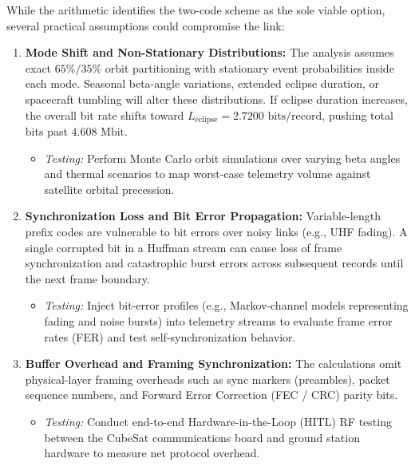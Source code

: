 \documentclass[11pt,a4paper]{article}
\begin{document}
While the arithmetic identifies the two-code scheme as the sole viable option, several practical assumptions could compromise the link:

\begin{enumerate}
    \item \textbf{Mode Shift and Non-Stationary Distributions:} The analysis assumes exact $65\% / 35\%$ orbit partitioning with stationary event probabilities inside each mode. Seasonal beta-angle variations, extended eclipse duration, or spacecraft tumbling will alter these distributions. If eclipse duration increases, the overall bit rate shifts toward $L_{\mathrm{eclipse}} = 2.7200\text{ bits/record}$, pushing total bits past $4.608\text{ Mbit}$.
    \begin{itemize}
        \item \textit{Testing:} Perform Monte Carlo orbit simulations over varying beta angles and thermal scenarios to map worst-case telemetry volume against satellite orbital precession.
    \end{itemize}

    \item \textbf{Synchronization Loss and Bit Error Propagation:} Variable-length prefix codes are vulnerable to bit errors over noisy links (e.g., UHF fading). A single corrupted bit in a Huffman stream can cause loss of frame synchronization and catastrophic burst errors across subsequent records until the next frame boundary.
    \begin{itemize}
        \item \textit{Testing:} Inject bit-error profiles (e.g., Markov-channel models representing fading and noise bursts) into telemetry streams to evaluate frame error rates (FER) and test self-synchronization behavior.
    \end{itemize}

    \item \textbf{Buffer Overhead and Framing Synchronization:} The calculations omit physical-layer framing overheads such as sync markers (preambles), packet sequence numbers, and Forward Error Correction (FEC / CRC) parity bits.
    \begin{itemize}
        \item \textit{Testing:} Conduct end-to-end Hardware-in-the-Loop (HITL) RF testing between the CubeSat communications board and ground station hardware to measure net protocol overhead.
    \end{itemize}
\end{enumerate}
\end{document}
